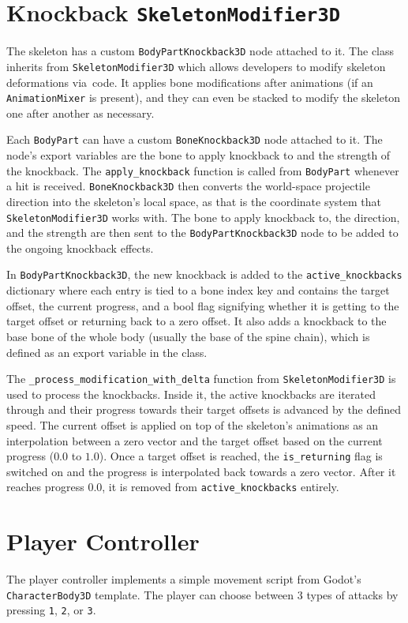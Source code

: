 \section{Knockback \texttt{SkeletonModifier3D}}
\label{Knockback}
The skeleton has a custom \texttt{BodyPartKnockback3D} node attached to it. The class inherits from \texttt{SkeletonModifier3D} which allows developers to modify skeleton deformations via~code. It applies bone modifications after animations (if an \texttt{AnimationMixer} is present), and they can even be stacked to modify the skeleton one after another as necessary.

Each \texttt{BodyPart} can have a custom \texttt{BoneKnockback3D} node attached to it. The node's export variables are the bone to apply knockback to and the strength of the knockback. The \texttt{apply\_knockback} function is called from \texttt{BodyPart} whenever a hit is received. \texttt{BoneKnockback3D} then converts the world-space projectile direction into the skeleton's local space, as that is the coordinate system that \texttt{SkeletonModifier3D} works with. The bone to apply knockback to, the direction, and the strength are then sent to the \texttt{BodyPartKnockback3D} node to be added to the ongoing knockback effects.

In \texttt{BodyPartKnockback3D}, the new knockback is added to the \texttt{active\_knockbacks} dictionary where each entry is tied to a bone index key and contains the target offset, the current progress, and a bool flag signifying whether it is getting to the target offset or returning back to a zero offset. It also adds a knockback to the base bone of the whole body (usually the base of the spine chain), which is defined as an export variable in the class.

The \texttt{\_process\_modification\_with\_delta} function from \texttt{SkeletonModifier3D} is used to process the knockbacks. Inside it, the active knockbacks are iterated through and their progress towards their target offsets is advanced by the defined speed. The current offset is applied on top of the skeleton's animations as an interpolation between a zero vector and the target offset based on the current progress ($0.0$ to $1.0$). Once a target offset is reached, the \texttt{is\_returning} flag is switched on and the progress is interpolated back towards a zero vector. After it reaches progress $0.0$, it is removed from \texttt{active\_knockbacks} entirely.


\section{Player Controller}
\label{PlayerController}
The player controller implements a simple movement script from Godot's \texttt{CharacterBody3D} template. The player can choose between 3 types of attacks by pressing \texttt{1}, \texttt{2}, or \texttt{3}.

